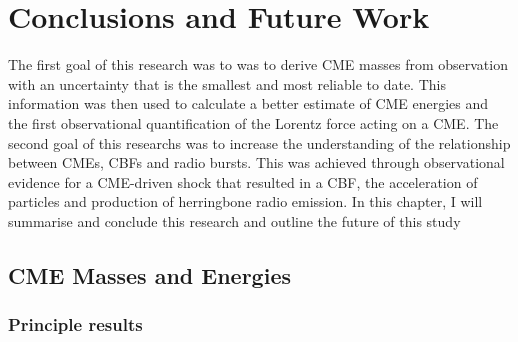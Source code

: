
\singlespacing
\chapter{Conclusions and Future Work} 

\label{chap:6}

\doublespacing
The first goal of this research was to was to derive CME masses from observation with an uncertainty that is the smallest and most reliable to date. This information was then used to calculate a better estimate of CME energies and the first observational quantification of the Lorentz force acting on a CME. 
The second goal of this researchs was to increase the understanding of the relationship between CMEs, CBFs and radio bursts. This was achieved through observational evidence for a CME-driven shock that resulted in a CBF, the acceleration of particles and production of herringbone radio emission. In this chapter, I will summarise and conclude this research and outline the future of this study
\clearpage

\section{CME Masses and Energies}

\subsection{Principle results}

